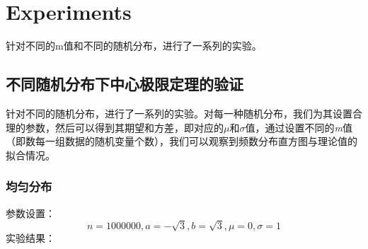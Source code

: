 \documentclass{article}
\begin{document}
\section{Experiments}\label{experiment}
针对不同的m值和不同的随机分布，进行了一系列的实验。
\subsection{不同随机分布下中心极限定理的验证}
针对不同的随机分布，进行了一系列的实验。对每一种随机分布，我们为其设置合理的参数，然后可以得到其期望和方差，即对应的$\mu\text{和}\sigma$值，通过设置不同的\textit{m}值（即数每一组数据的随机变量个数），我们可以观察到频数分布直方图与理论值的拟合情况。
\subsubsection{均匀分布}
参数设置：
\[
n=1000000, a = -\sqrt{3}, b = \sqrt{3}, \mu = 0, \sigma = 1
\]
实验结果：
\end{document}
